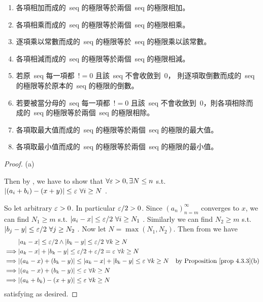 \begin{note}
\begin{enumerate}
\item 各項相加而成的\ seq 的極限等於兩個\ seq 的極限相加。 
\item 各項相乘而成的\ seq 的極限等於兩個\ seq 的極限相乘。
\item 逐項乘以常數而成的\ seq 的極限等於\ seq 的極限乘以該常數。
\item 各項相減而成的\ seq 的極限等於兩個\ seq 的極限相減。
\item 若原\ seq 每一項都\ \(!= 0\) 且該\ seq 不會收斂到\ 0，
則逐項取倒數而成的\ seq 的極限等於原本的\ seq 的極限的倒數。
\item 若要被當分母的\ seq 每一項都\ \(!= 0\) 且該\ seq 不會收斂到\ 0，則各項相除而成的\ seq 的極限等於兩個\ seq 的極限相除。
\item 各項取最大值而成的\ seq 的極限等於兩個\ seq 的極限的最大值。
\item 各項取最小值而成的\ seq 的極限等於兩個\ seq 的極限的最小值。
\end{enumerate}
\end{note}

\begin{proof} (a)

Then by , we have to show that \(\forall \varepsilon > 0, \exists N \le n\) s.t. \(\lvert(a_i + b_i) - (x + y)\rvert \le \varepsilon\ \forall i \ge N\) \BLUE{(*)}.

So let arbitrary \(\varepsilon > 0\).
In particular \(\varepsilon/2 > 0\).
Since \((a_n)_{n = m}^{\infty}\) converges to \(x\), we can find \(N_1 \ge m\) s.t. \(\lvert a_i - x\rvert \le \varepsilon/2\ \forall i \ge N_1\) .
Similarly we can find \(N_2 \ge m\) s.t. \(\lvert b_j - y\rvert \le \varepsilon/2\ \forall j \ge N_2\) .
Now let \(N = \max(N_1, N_2)\).
Then from  we have
\begin{align*}
             & \abs{a_k - x} \le \varE/2 \land \abs{b_k - y} \le \varE/2\ \forall k \ge N \\
    \implies & \abs{a_k - x} + \abs{b_k - y} \le \varE/2 + \varE/2 = \varE\ \forall k \ge N \\
    \implies & \abs{(a_k - x) + (b_k - y)} \le \abs{a_k - x} + \abs{b_k - y} \le \varE\ \forall k \ge N & \text{by \PROP{4.3.3}(b)} \\
    \implies & \abs{(a_k - x) + (b_k - y)} \le \varE\ \forall k \ge N \\
    \implies & \abs{(a_k + b_k) - (x + y)} \le \varE\ \forall k \ge N
\end{align*}
satisfying \BLUE{(*)} as desired.
\end{proof}

